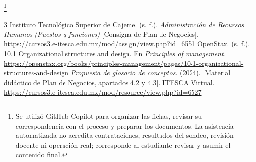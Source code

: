 {\footnote{Se utilizó GitHub Copilot para organizar las fichas, revisar su correspondencia con el proceso y preparar los documentos. La asistencia automatizada no acredita contrataciones, resultados del sondeo, revisión docente ni operación real; corresponde al estudiante revisar y asumir el contenido final.}
\clearpage\renewcommand{\refname}{Referencias}\begin{thebibliography}{3}
Instituto Tecnológico Superior de Cajeme. (s. f.). \textit{Administración de Recursos Humanos (Puestos y funciones)} [Consigna de Plan de Negocios]. \url{https://cursos3.e-itesca.edu.mx/mod/assign/view.php?id=6551}
OpenStax. (s. f.). 10.1 Organizational structures and design. En \textit{Principles of management}. \url{https://openstax.org/books/principles-management/pages/10-1-organizational-structures-and-design}
\textit{Propuesta de glosario de conceptos}. (2024). [Material didáctico de Plan de Negocios, apartados 4.2 y 4.3]. ITESCA Virtual. \url{https://cursos3.e-itesca.edu.mx/mod/resource/view.php?id=6527}
\end{thebibliography}
}

